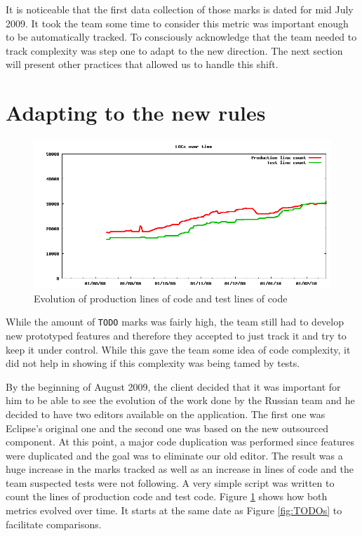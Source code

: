 \documentclass[lnbip]{svmultln}
\begin{document}
It is noticeable that the first data collection of those marks is dated for mid
July 2009. It took the team some time to consider this metric was important
enough to be automatically tracked. To consciously acknowledge that the team
needed to track complexity was step one to adapt to the new direction. The next
section will present other practices that allowed us to handle this shift.

\section{Adapting to the new rules}
\label{sec:adapting}

\begin{figure}[hbt]
  \centerline{
    \includegraphics[width=120mm]{LOCs.png}
  }
  \caption{Evolution of production lines of code and test lines of
    code}
  \label{fig:LOCs}
\end{figure}

While the amount of \texttt{TODO} marks was fairly high, the team
still had to develop new prototyped features and therefore they
accepted to just track it and try to keep it under control. While this
gave the team some idea of code complexity, it did not help in showing
if this complexity was being tamed by tests.

By the beginning of August 2009, the client decided that it was
important for him to be able to see the evolution of the work done by
the Russian team and he decided to have two editors available on the
application. The first one was Eclipse's original one and the second
one was based on the new outsourced component. At this point, a major
code duplication was performed since features were duplicated and the
goal was to eliminate our old editor. The result was a huge increase
in the marks tracked as well as an increase in lines of code and the
team suspected tests were not following. A very simple script was
written to count the lines of production code and test code. Figure
\ref{fig:LOCs} shows how both metrics evolved over time. It starts at
the same date as Figure \ref{fig:TODOs} to facilitate comparisons.
\end{document}
